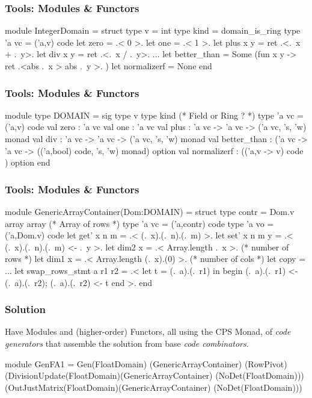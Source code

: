 \documentclass{beamer}
\begin{document}
\begin{frame}[fragile]
    \frametitle{Tools: Modules \& Functors}
\begin{code}
module IntegerDomain = 
  struct
    type v = int
    type kind = domain_is_ring
    type 'a vc = ('a,v) code
    let zero = .< 0 >.  
    let one = .< 1 >. 
    let plus x y = ret .<.~x + .~y>. 
    let div x y = ret .<.~x / .~y>.
    ...
    let better_than = Some (fun x y -> ret .<abs .~x > abs .~y >. )
    let normalizerf = None 
end
\end{code}
\end{frame}

\begin{frame}[fragile]
    \frametitle{Tools: Modules \& Functors}
\begin{code}
module type DOMAIN = sig
  type v
  type kind (* Field or Ring ? *)
  type 'a vc = ('a,v) code
  val zero : 'a vc
  val one : 'a vc
  val plus : 'a vc -> 'a vc -> ('a vc, 's, 'w) monad
  val div : 'a vc -> 'a vc -> ('a vc, 's, 'w) monad
  val better_than : ('a vc -> 'a vc -> 
                    (('a,bool) code, 's, 'w) monad) option
  val normalizerf : (('a,v -> v) code ) option
end 
\end{code}
\end{frame}

\begin{frame}[fragile]
    \frametitle{Tools: Modules \& Functors}
\begin{code}
module GenericArrayContainer(Dom:DOMAIN) = struct
  type contr = Dom.v array array (* Array of rows *)
  type 'a vc = ('a,contr) code
  type 'a vo = ('a,Dom.v) code
  let get' x n m = .< (.~x).(.~n).(.~m) >.
  let set' x n m y = .< (.~x).(.~n).(.~m) <- .~y >.
  let dim2 x = .< Array.length .~x >.       (* number of rows *)
  let dim1 x = .< Array.length (.~x).(0) >. (* number of cols *)
  let copy = ...
  let swap_rows_stmt a r1 r2 =
      .< let t = (.~a).(.~r1) in
         begin 
             (.~a).(.~r1) <- (.~a).(.~r2);
             (.~a).(.~r2) <- t
         end >.
end
\end{code}
\end{frame}

\begin{frame}[fragile]
    \frametitle{Solution}
    Have Modules and (higher-order) Functors, all using the CPS Monad, of
    \emph{code generators} that assemble the solution from base \emph{code
    combinators}.
\begin{code}
module GenFA1 = 
    Gen(FloatDomain)
       (GenericArrayContainer)
       (RowPivot)
       (DivisionUpdate(FloatDomain)(GenericArrayContainer)
                      (NoDet(FloatDomain)))
       (OutJustMatrix(FloatDomain)(GenericArrayContainer)
                     (NoDet(FloatDomain)))
\end{code}
\end{frame}
\end{document}
